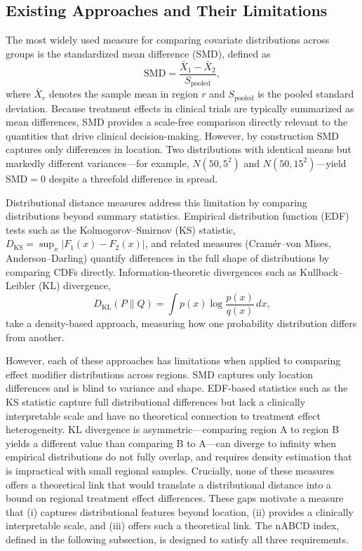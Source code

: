 \documentclass[AMA,Times1COL]{WileyNJDv5}
\begin{document}
\subsection{Existing Approaches and Their Limitations}\label{sec:existing}

The most widely used measure for comparing covariate distributions across groups is the standardized mean difference (SMD), defined as
\begin{equation}
\text{SMD} = \frac{\bar{X}_1 - \bar{X}_2}{S_{\text{pooled}}},
\label{eq:smd}
\end{equation}
where $\bar{X}_r$ denotes the sample mean in region $r$ and $S_{\text{pooled}}$ is the pooled standard deviation.\cite{austin2011} Because treatment effects in clinical trials are typically summarized as mean differences, SMD provides a scale-free comparison directly relevant to the quantities that drive clinical decision-making. However, by construction SMD captures only differences in location. Two distributions with identical means but markedly different variances---for example, $N(50, 5^2)$ and $N(50, 15^2)$---yield $\text{SMD} = 0$ despite a threefold difference in spread.

Distributional distance measures address this limitation by comparing distributions beyond summary statistics. Empirical distribution function (EDF) tests such as the Kolmogorov--Smirnov (KS) statistic, $D_{\text{KS}} = \sup_x |F_1(x) - F_2(x)|$, and related measures (Cram\'{e}r--von Mises, Anderson--Darling) quantify differences in the full shape of distributions by comparing CDFs directly. Information-theoretic divergences such as Kullback--Leibler (KL) divergence,
\begin{equation}
D_{\text{KL}}(P \| Q) = \int p(x) \log \frac{p(x)}{q(x)} \, dx,
\label{eq:kl}
\end{equation}
take a density-based approach, measuring how one probability distribution differs from another.

However, each of these approaches has limitations when applied to comparing effect modifier distributions across regions. SMD captures only location differences and is blind to variance and shape. EDF-based statistics such as the KS statistic capture full distributional differences but lack a clinically interpretable scale and have no theoretical connection to treatment effect heterogeneity. KL divergence is asymmetric---comparing region A to region B yields a different value than comparing B to A---can diverge to infinity when empirical distributions do not fully overlap, and requires density estimation that is impractical with small regional samples. Crucially, none of these measures offers a theoretical link that would translate a distributional distance into a bound on regional treatment effect differences. These gaps motivate a measure that (i) captures distributional features beyond location, (ii) provides a clinically interpretable scale, and (iii) offers such a theoretical link. The nABCD index, defined in the following subsection, is designed to satisfy all three requirements.
\end{document}
